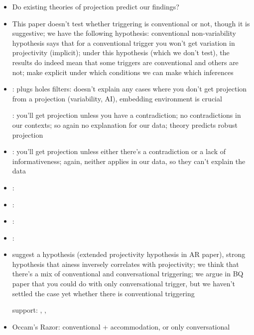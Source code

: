 \documentclass[11pt,fleqn]{article}
\newcommand{\6}{\mbox{$[\hspace*{-.6mm}[$}}
\newcommand{\9}{\mbox{$]\hspace*{-.6mm}]$}}
\begin{document}
\begin{itemize}

\item Do existing theories of projection predict our findings?

\item This paper doesn't test whether triggering is conventional or not, though it is suggestive; we have the following hypothesis: conventional non-variability hypothesis says that for a conventional trigger you won't get variation in projectivity (implicit); under this hypothesis (which we don't test), the results do indeed mean that some triggers are conventional and others are not; make explicit under which conditions we can make which inferences

\item \citealt{karttunen73}: plugs holes filters: doesn't explain any cases where you don't get projection from a projection (variability, AI), embedding environment is crucial

\citealt{gazdar79a}: you'll get projection unless you have a contradiction; no contradictions in our contexts; so again no explanation for our data; theory predicts robust projection

\item \citealt{heim83,vds92}: you'll get projection unless either there's a contradiction or a lack of informativeness; again, neither applies in our data, so they can't explain the data

\item \citealt{partee96}:

\item \citealt{schlenker10}:

\item \citealt{abusch2010}:

\item \citealt{abrusan2011,abrusan2016}: 

\item \citealt{brst-salt10,brst-ar} suggest a hypothesis (extended projectivity hypothesis in AR paper), strong hypothesis that ainess inversely correlates with projectivity; we think that there's a mix of conventional and conversational triggering; we argue in BQ paper that you could do with only conversational trigger, but we haven't settled the case yet whether there is conventional triggering

support: \citealt{tonhauser-salt26}, \citealt{stevens-etal2017}, \citealt{best-question}


\item Occam's Razor: conventional + accommodation, or only conversational




\end{itemize}
\end{document}

